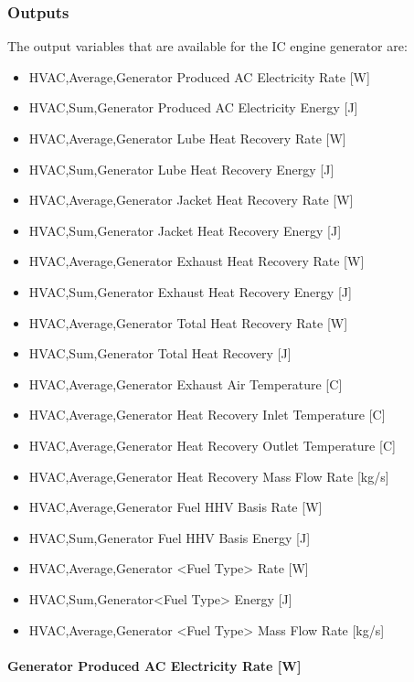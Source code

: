 \subsubsection{Outputs}\label{outputs-5-002}

The output variables that are available for the IC engine generator are:

\begin{itemize}
\item
  HVAC,Average,Generator Produced AC Electricity Rate {[}W{]}
\item
  HVAC,Sum,Generator Produced AC Electricity Energy {[}J{]}
\item
  HVAC,Average,Generator Lube Heat Recovery Rate {[}W{]}
\item
  HVAC,Sum,Generator Lube Heat Recovery Energy {[}J{]}
\item
  HVAC,Average,Generator Jacket Heat Recovery Rate {[}W{]}
\item
  HVAC,Sum,Generator Jacket Heat Recovery Energy {[}J{]}
\item
  HVAC,Average,Generator Exhaust Heat Recovery Rate {[}W{]}
\item
  HVAC,Sum,Generator Exhaust Heat Recovery Energy {[}J{]}
\item
  HVAC,Average,Generator Total Heat Recovery Rate {[}W{]}
\item
  HVAC,Sum,Generator Total Heat Recovery {[}J{]}
\item
  HVAC,Average,Generator Exhaust Air Temperature {[}C{]}
\item
  HVAC,Average,Generator Heat Recovery Inlet Temperature {[}C{]}
\item
  HVAC,Average,Generator Heat Recovery Outlet Temperature {[}C{]}
\item
  HVAC,Average,Generator Heat Recovery Mass Flow Rate {[}kg/s{]}
\item
  HVAC,Average,Generator Fuel HHV Basis Rate {[}W{]}
\item
  HVAC,Sum,Generator Fuel HHV Basis Energy {[}J{]}
\item
  HVAC,Average,Generator \textless{}Fuel Type\textgreater{} Rate {[}W{]}
\item
  HVAC,Sum,Generator\textless{}Fuel Type\textgreater{} Energy {[}J{]}
\item
  HVAC,Average,Generator \textless{}Fuel Type\textgreater{} Mass Flow Rate {[}kg/s{]}
\end{itemize}

\paragraph{Generator Produced AC Electricity Rate {[}W{]}}\label{generator-produced-electric-power-w}

